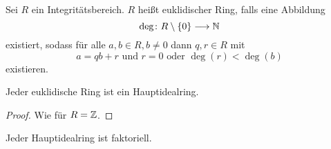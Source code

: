 \documentclass[12pt,a4paper]{scrartcl}
\begin{document}
\begin{defi} Sei $R$ ein Integritätsbereich. $R$ heißt euklidischer Ring, falls eine Abbildung
	$$\deg \colon R\setminus\{0\} \longrightarrow \mathbb N$$
	existiert, sodass für alle $a,b\in R, b\neq 0$ dann $q, r\in R$ mit \[a = qb+r \text{ und $r = 0$ oder $\deg(r)<\deg(b)$}\] existieren.
\end{defi}

\begin{satz}
	Jeder euklidische Ring ist ein Hauptidealring.
\end{satz}
\begin{proof}
	Wie für $R = \mathbb Z$.
\end{proof}

\begin{satz}\label{thm:hirfakt}
	Jeder Hauptidealring ist faktoriell.
\end{satz}
\end{document}
